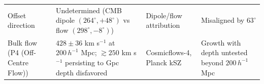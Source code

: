 \documentclass[
  11pt,
]{article}
\begin{document}
\begin{longtable}[]{@{}llll@{}}
\begin{minipage}[t]{0.22\columnwidth}\raggedright
Offset direction\strut
\end{minipage} & \begin{minipage}[t]{0.22\columnwidth}\raggedright
Undetermined (CMB dipole \((264^\circ,+48^\circ)\) vs flow
\((298^\circ,-8^\circ)\))\strut
\end{minipage} & \begin{minipage}[t]{0.22\columnwidth}\raggedright
Dipole/flow attribution\strut
\end{minipage} & \begin{minipage}[t]{0.22\columnwidth}\raggedright
Misaligned by \(63^\circ\)\strut
\end{minipage}\tabularnewline
\begin{minipage}[t]{0.22\columnwidth}\raggedright
Bulk flow (P4 (Off-Centre Flow))\strut
\end{minipage} & \begin{minipage}[t]{0.22\columnwidth}\raggedright
\(428 \pm 36\) km s\(^{-1}\) at \(200\,h^{-1}\) Mpc; \(\gtrsim 250\) km
s\(^{-1}\) persisting to Gpc depth disfavored\strut
\end{minipage} & \begin{minipage}[t]{0.22\columnwidth}\raggedright
Cosmicflows-4, Planck kSZ\strut
\end{minipage} & \begin{minipage}[t]{0.22\columnwidth}\raggedright
Growth with depth untested beyond \(200\,h^{-1}\) Mpc\strut
\end{minipage}\tabularnewline
\bottomrule
\end{longtable}
\end{document}
